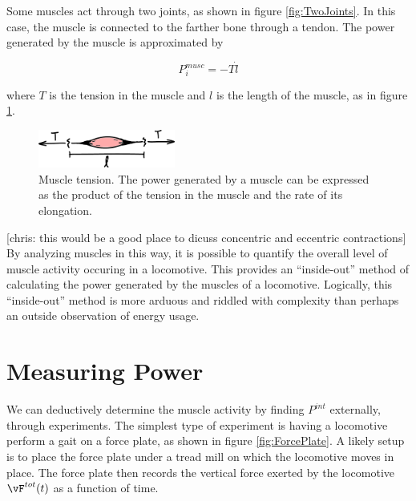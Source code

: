 Some muscles act through two joints, as shown in figure \ref{fig:TwoJoints}. In this case, the muscle is connected to the farther bone through a tendon. The power generated by the muscle is approximated by

\begin{equation}
P_{i}^{musc} = - T \dot{l}
\end{equation}

where $T$ is the tension in the muscle and $l$ is the length of the muscle, as in figure \ref{fig:OneMuscle}.

\begin{figure}[h]		%
\begin{centering}
\includegraphics[width=0.4\textwidth]{Figures/OneMuscle}\par
\end{centering}
\caption[Diagram: Muscle tension]{Muscle tension. The power generated by a muscle can be expressed as the product of the tension in the muscle and the rate of its elongation.}
\label{fig:OneMuscle}
\end{figure}
%
[chris: this would be a good place to dicuss concentric and eccentric contractions]
By analyzing muscles in this way, it is possible to quantify the overall level of muscle activity occuring in a locomotive. This provides an ``inside-out'' method of calculating the power generated by the muscles of a locomotive. Logically, this ``inside-out'' method is more arduous and riddled with complexity than perhaps an outside observation of energy usage.

\section{Measuring Power}
\label{sec:MeasuringPower}

We can deductively determine the muscle activity by finding $P^{int}$ externally, through experiments. The simplest type of experiment is having a locomotive perform a gait on a force plate, as shown in figure \ref{fig:ForcePlate}. A likely setup is to place the force plate under a tread mill on which the locomotive moves in place. The force plate then records the vertical force exerted by the locomotive $\vF^{tot}(t)$ as a function of time.

